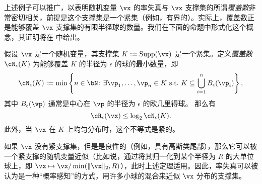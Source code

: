 \documentclass[../../book-main.tex]{subfiles}
\begin{document}
上述例子可以推广，以表明随机变量 \(\vx\) 的率失真与 \(\vx\) 支撑集的所谓\textit{覆盖数}非常密切相关，前提是这个支撑集是一个紧集（例如，有界的）。实际上，覆盖数正是能够覆盖 \(\vx\) 支撑集的有限半径球的数量。我们在下面的命题中形式化这个概念，其证明将在  中给出。

\begin{proposition}\label{prop:covering-number-rate-distortion}
	假设 \(\vx\) 是一个随机变量，其支撑集 \(K := \Supp(\vx)\) 是一个紧集。定义\textit{覆盖数} \(\cN_{\epsilon}(K)\) 为能够覆盖 \(K\) 的半径为 \(\epsilon\) 的球的最小数量，即
	\begin{equation}
		\cN_{\epsilon}(K) := \min\left\{n \in \bN \colon \exists \vp_{1}, \dots, \vp_{n} \in K\ \text{s.t.}\ K \subseteq \bigcup_{i = 1}^{n}B_{\epsilon}(\vp_{i})\right\},
	\end{equation}
	其中 \(B_{\epsilon}(\vp)\) 通常是中心在 \(\vp\) 的半径为 \(\epsilon\) 的欧几里得球。
	那么有
	\begin{equation}
		\cR_{\epsilon}(\vx) \leq \log_{2} \cN_{\epsilon}(K).
	\end{equation}
	此外，当 \(\vx\) 在 \(K\) 上均匀分布时，这个不等式是紧的。
\end{proposition}
如果 \(\vx\) 没有紧支撑集，但是是良性的（例如，具有高斯类尾部），那么它可以被一个紧支撑的随机变量近似（比如说，通过将其归一化到某个半径为 \(R\) 的大单位球上，即 \(\vx \mapsto \vx / \min(\|\vx\|_2, R)\)），此时上述定理适用。因此，率失真可以被认为是一种“概率感知”的方式，用许多小球的混合来近似 \(\vx\) 分布的支撑集。
\end{document}
